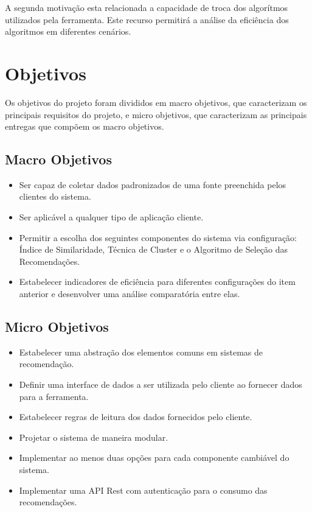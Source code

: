 \documentclass[
	12pt,				%
    oneside,			%
	a4paper,			%
	english,			%
	french,				%
	spanish,			%
	brazil,				%
	]{abntex2}
\begin{document}
A segunda motivação esta relacionada a capacidade de troca dos algorítmos utilizados pela ferramenta. Este recurso
permitirá a análise da eficiência dos algoritmos em diferentes cenários.

\section{Objetivos}
Os objetivos do projeto foram divididos em macro objetivos, que caracterizam os principais requisitos do projeto, e micro objetivos, que caracterizam as principais
entregas que compõem os macro objetivos.

\subsection{Macro Objetivos}
\begin{itemize}
	\item Ser capaz de coletar dados padronizados de uma fonte preenchida pelos clientes do sistema.
	\item Ser aplicável a qualquer tipo de aplicação cliente.
	\item Permitir a escolha dos seguintes componentes do sistema via configuração: Índice de Similaridade, Técnica de Cluster e o Algoritmo de Seleção das Recomendações. 
	\item Estabelecer indicadores de eficiência para diferentes configurações do item anterior e desenvolver uma análise comparatória entre elas.
\end{itemize}

\subsection{Micro Objetivos}
\begin{itemize}
	\item Estabelecer uma abstração dos elementos comuns em sistemas de recomendação.
	\item Definir uma interface de dados a ser utilizada pelo cliente ao fornecer dados para a ferramenta.
	\item Estabelecer regras de leitura dos dados fornecidos pelo cliente.
	\item Projetar o sistema de maneira modular.
	\item Implementar ao menos duas opções para cada componente cambiável do sistema.
	\item Implementar uma API Rest com autenticação para o consumo das recomendações.
\end{itemize}
\end{document}

